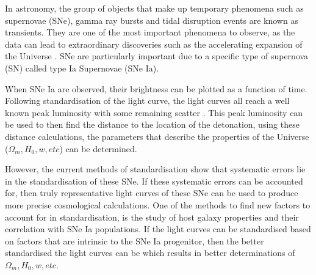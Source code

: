 In astronomy, the group of objects that make up temporary phenomena such as supernovae (SNe), gamma ray bursts and tidal disruption events are known as transients. They are one of the most important phenomena to observe, as the data can lead to extraordinary discoveries such as the accelerating expansion of the Universe \parencite{riess_observational_1998, perlmutter_measurements_1999}. SNe are particularly important due to a specific type of supernova (SN) called type Ia Supernovae (SNe Ia). 

When SNe Ia are observed, their brightness can be plotted as a function of time. Following standardisation of the light curve, the light curves all reach a well known peak luminosity with some remaining scatter \parencite{martin_o_2024, kelsey_concerning_2022, ginolin_ztf_2025}. This peak luminosity can be used to then find the distance to the location of the detonation, using these distance calculations, the parameters that describe the properties of the Universe (\(\Omega_m, H_0, w, etc\)) can be determined. 

However, the current methods of standardisation show that systematic errors lie in the standardisation of these SNe. If these systematic errors can be accounted for, then truly representative light curves of these SNe can be used to produce more precise cosmological calculations. One of the methods to find new factors to account for in standardisation, is the study of host galaxy properties and their correlation with SNe Ia populations. If the light curves can be standardised based on factors that are intrinsic to the SNe Ia progenitor, then the better standardised the light curves can be which results in better determinations of \(\Omega_m, H_0, w, etc\).